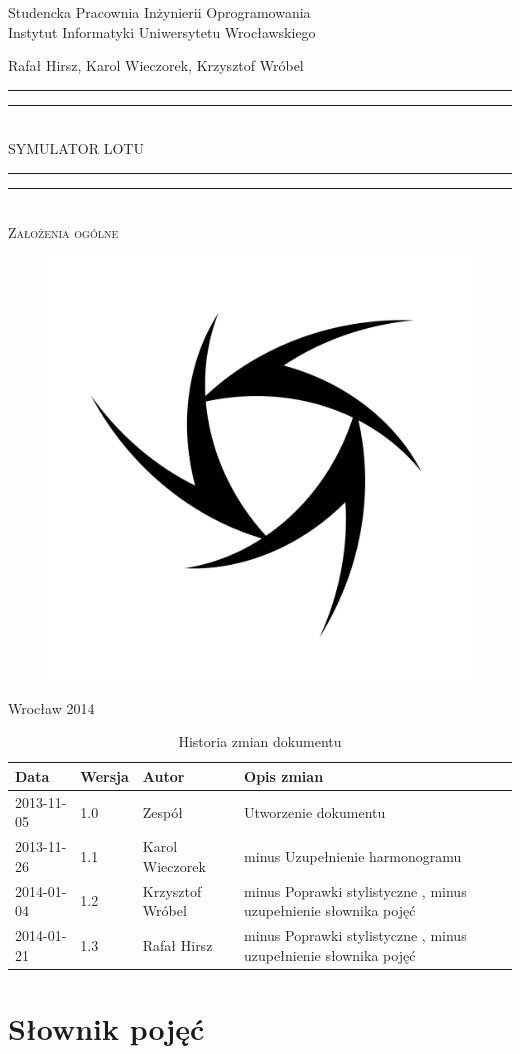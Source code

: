 \documentclass{mwrep}
\newcommand*{\titleGP}{\begingroup
\centering

{\large Studencka Pracownia Inżynierii Oprogramowania}\\Instytut Informatyki Uniwersytetu Wrocławskiego\par
\vspace*{16\baselineskip}

{\Large Rafał Hirsz, Karol Wieczorek, Krzysztof Wróbel\par}
\vspace*{\baselineskip}

\rule{\textwidth}{1.6pt}\vspace*{-\baselineskip}\vspace*{2pt}
\rule{\textwidth}{0.4pt}\\[\baselineskip]

{\Huge SYMULATOR LOTU}\\[0.2\baselineskip]

\rule{\textwidth}{0.4pt}\vspace*{-\baselineskip}\vspace{3.2pt}
\rule{\textwidth}{1.6pt}\\[\baselineskip]

\scshape
{\huge Założenia ogólne}\par
\vspace*{2\baselineskip}

\begin{figure}[h]
\centering
\includegraphics[width=5\baselineskip]{flightsim-team-logo.pdf}
\end{figure}
\vfill

{\large Wrocław 2014}\par

\pagebreak

\endgroup}
\newcommand{\fixedspaceword}[2][1]{%
  \begingroup
  \spaceskip=#1\fontdimen2\font minus \fontdimen4\font
  \xspaceskip=0pt\relax %
  #2%
  \endgroup
}
\begin{document}
\thispagestyle{empty}
\titleGP

\begin{center}
\begin{table}[h]
\begin{center}
\caption{Historia zmian dokumentu}\label{T:Zmiany}
\vspace{3ex}
\begin{tabularx}{1\textwidth}{|l|l|l|X|}
\hline
Data & Wersja & Autor & Opis zmian \\ \hline
2013-11-05 & 1.0 & Zespół & Utworzenie dokumentu \\
2013-11-26 & 1.1 & Karol Wieczorek & \fixedspaceword{Uzupełnienie harmonogramu} \\
2014-01-04 & 1.2 & Krzysztof Wróbel & \fixedspaceword{Poprawki stylistyczne}, \fixedspaceword{uzupełnienie słownika pojęć} \\
2014-01-21 & 1.3 & Rafał Hirsz & \fixedspaceword{Poprawki stylistyczne}, \fixedspaceword{uzupełnienie słownika pojęć} \\
\hline
\end{tabularx}
\end{center}
\end{table}
\end{center}

\pagebreak

\tableofcontents

\chapter{Słownik pojęć\protect\footnotemark[1]{}}

\end{document}
